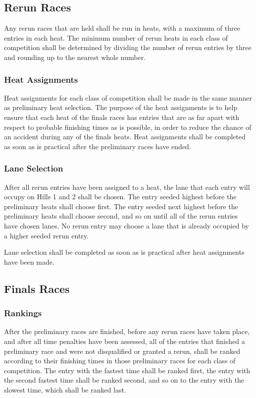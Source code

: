 \subsection{Rerun Races}

	Any rerun races that are held shall be run in heats, with a maximum of three entries in each heat. The minimum number of rerun heats in each class of competition shall be determined by dividing the number of rerun entries by three and rounding up to the nearest whole number.

\subsubsection{Heat Assignments}

	Heat assignments for each class of competition shall be made in the same manner as preliminary heat selection. The purpose of the heat assignments is to help ensure that each heat of the finals races has entries that are as far apart with respect to probable finishing times as is possible, in order to reduce the chance of an accident during any of the finals heats. Heat assignments shall be completed as soon as is practical after the preliminary races have ended.

\subsubsection{Lane Selection}

	After all rerun entries have been assigned to a heat, the lane that each entry will occupy on Hills 1 and 2 shall be chosen. The entry seeded highest before the preliminary heats shall choose first. The entry seeded next highest before the preliminary heats shall choose second, and so on until all of the rerun entries have chosen lanes. No rerun entry may choose a lane that is already occupied by a higher seeded rerun entry.

	Lane selection shall be completed as soon as is practical after heat assignments have been made.

\subsection{Finals Races}

\subsubsection{Rankings}

	After the preliminary races are finished, before any rerun races have taken place, and after all time penalties have been assessed, all of the entries that finished a preliminary race and were not disqualified or granted a rerun, shall be ranked according to their finishing times in those preliminary races for each class of competition.
    The entry with the fastest time shall be ranked first, the entry with the second fastest time shall be ranked second, and so on to the entry with the slowest time, which shall be ranked last.

